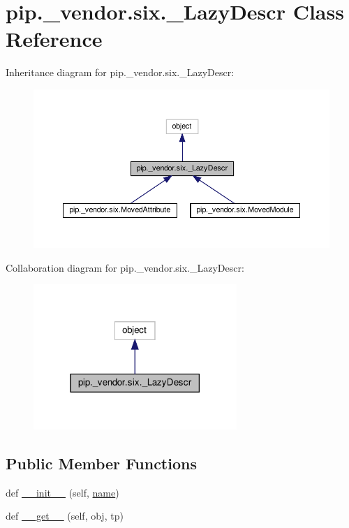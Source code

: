 \hypertarget{classpip_1_1__vendor_1_1six_1_1__LazyDescr}{}\section{pip.\+\_\+vendor.\+six.\+\_\+\+Lazy\+Descr Class Reference}
\label{classpip_1_1__vendor_1_1six_1_1__LazyDescr}


Inheritance diagram for pip.\+\_\+vendor.\+six.\+\_\+\+Lazy\+Descr\+:
\nopagebreak
\begin{figure}[H]
\begin{center}
\leavevmode
\includegraphics[width=350pt]{classpip_1_1__vendor_1_1six_1_1__LazyDescr__inherit__graph}
\end{center}
\end{figure}


Collaboration diagram for pip.\+\_\+vendor.\+six.\+\_\+\+Lazy\+Descr\+:
\nopagebreak
\begin{figure}[H]
\begin{center}
\leavevmode
\includegraphics[width=218pt]{classpip_1_1__vendor_1_1six_1_1__LazyDescr__coll__graph}
\end{center}
\end{figure}
\subsection*{Public Member Functions}
\begin{DoxyCompactItemize}
\item 
def \hyperlink{classpip_1_1__vendor_1_1six_1_1__LazyDescr_af93c7a4aa6964523538699c8887b35d3}{\+\_\+\+\_\+init\+\_\+\+\_\+} (self, \hyperlink{classpip_1_1__vendor_1_1six_1_1__LazyDescr_ac79dd785588d4b38378ddb12da59caf2}{name})
\item 
def \hyperlink{classpip_1_1__vendor_1_1six_1_1__LazyDescr_a9e5fa81bca226a61256c0e98fb48266c}{\+\_\+\+\_\+get\+\_\+\+\_\+} (self, obj, tp)
\end{DoxyCompactItemize}
